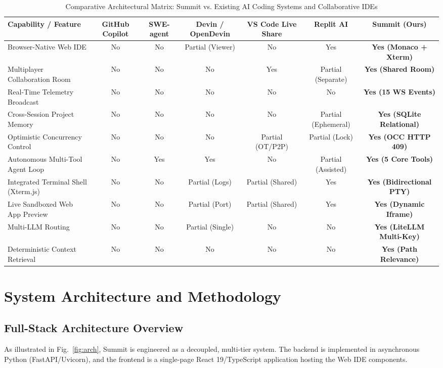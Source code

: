 \documentclass[conference]{IEEEtran}
\begin{document}
\begin{table}[t]
\caption{Comparative Architectural Matrix: Summit vs. Existing AI Coding Systems and Collaborative IDEs}
\label{tab:comparison}
\centering
\scriptsize
\begin{tabular}{lcccccc}
\toprule
\textbf{Capability / Feature} & \textbf{GitHub Copilot} \cite{copilot} & \textbf{SWE-agent} \cite{yang2024sweagent} & \textbf{Devin / OpenDevin} \cite{devin2024, wang2024opendevin} & \textbf{VS Code Live Share} & \textbf{Replit AI} & \textbf{Summit (Ours)} \\
\midrule
Browser-Native Web IDE & No & No & Partial (Viewer) & No & Yes & \textbf{Yes (Monaco + Xterm)} \\
Multiplayer Collaboration Room & No & No & No & Yes & Partial (Separate) & \textbf{Yes (Shared Room)} \\
Real-Time Telemetry Broadcast & No & No & No & No & No & \textbf{Yes (15 WS Events)} \\
Cross-Session Project Memory & No & No & No & No & Partial (Ephemeral) & \textbf{Yes (SQLite Relational)} \\
Optimistic Concurrency Control & No & No & No & Partial (OT/P2P) & Partial (Lock) & \textbf{Yes (OCC HTTP 409)} \\
Autonomous Multi-Tool Agent Loop & No & Yes & Yes & No & Partial (Assisted) & \textbf{Yes (5 Core Tools)} \\
Integrated Terminal Shell (Xterm.js) & No & No & Partial (Logs) & Partial (Shared) & Yes & \textbf{Yes (Bidirectional PTY)} \\
Live Sandboxed Web App Preview & No & No & Partial (Port) & Partial (Shared) & Yes & \textbf{Yes (Dynamic Iframe)} \\
Multi-LLM Routing & No & No & Partial (Single) & No & No & \textbf{Yes (LiteLLM Multi-Key)} \\
Deterministic Context Retrieval & No & No & No & No & No & \textbf{Yes (Path Relevance)} \\
\bottomrule
\end{tabular}
\end{table}

\section{System Architecture and Methodology}

\subsection{Full-Stack Architecture Overview}
As illustrated in Fig.~\ref{fig:arch}, Summit is engineered as a decoupled, multi-tier system. The backend is implemented in asynchronous Python (FastAPI/Uvicorn), and the frontend is a single-page React 19/TypeScript application hosting the Web IDE components.
\end{document}
